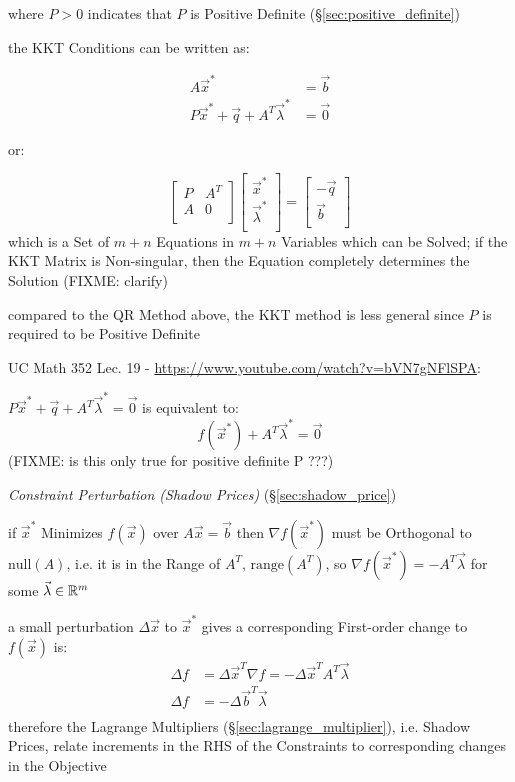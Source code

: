where $P > 0$ indicates that $P$ is Positive Definite
(\S\ref{sec:positive_definite})

the KKT Conditions can be written as:

\begin{align*}
  A\vec{x}^*                                & = \vec{b} \\
  P\vec{x}^* + \vec{q} + A^T\vec{\lambda}^* & = \vec{0}
\end{align*}

or:

\[
  \begin{bmatrix}
    P & A^T \\
    A & 0   \\
  \end{bmatrix}
  \begin{bmatrix}
    \vec{x}^*       \\
    \vec{\lambda}^* \\
  \end{bmatrix}
  =
  \begin{bmatrix}
    -\vec{q} \\
    \vec{b}  \\
  \end{bmatrix}
\]
which is a Set of $m + n$ Equations in $m + n$ Variables which can be Solved;
if the KKT Matrix is Non-singular, then the Equation completely determines the
Solution (FIXME: clarify)

compared to the QR Method above, the KKT method is less general since $P$ is
required to be Positive Definite


UC Math 352 Lec. 19 - \url{https://www.youtube.com/watch?v=bVN7gNFlSPA}:

$P\vec{x}^* + \vec{q} + A^T\vec{\lambda}^* = \vec{0}$ is equivalent to:
\[
  f(\vec{x}^*) + A^T\vec{\lambda}^* = \vec{0}
\]
(FIXME: is this only true for positive definite P ???)


\emph{Constraint Perturbation (Shadow Prices)} (\S\ref{sec:shadow_price})

if $\vec{x}^*$ Minimizes $f(\vec{x})$ over $A\vec{x} = \vec{b}$ then $\nabla
f(\vec{x}^*)$ must be Orthogonal to $\mathrm{null}(A)$, i.e. it is in the Range
of $A^T$, $\mathrm{range}(A^T)$, so $\nabla f(\vec{x}^*) = -A^T\vec{\lambda}$
for some $\vec{\lambda} \in \mathbb{R}^m$

a small perturbation $\Delta \vec{x}$ to $\vec{x}^*$ gives a corresponding
First-order change to $f(\vec{x})$ is:
\begin{align*}
  \Delta f & = \Delta\vec{x}^T\nabla{f} = -\Delta\vec{x}^TA^T\vec{\lambda} \\
  \Delta f & = -\Delta\vec{b}^T\vec{\lambda} \\
\end{align*}
therefore the Lagrange Multipliers (\S\ref{sec:lagrange_multiplier}), i.e.
Shadow Prices, relate increments in the RHS of the Constraints to corresponding
changes in the Objective


